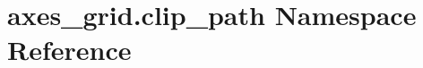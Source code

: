 \hypertarget{namespaceaxes__grid_1_1clip__path}{}\section{axes\+\_\+grid.\+clip\+\_\+path Namespace Reference}
\label{namespaceaxes__grid_1_1clip__path}
